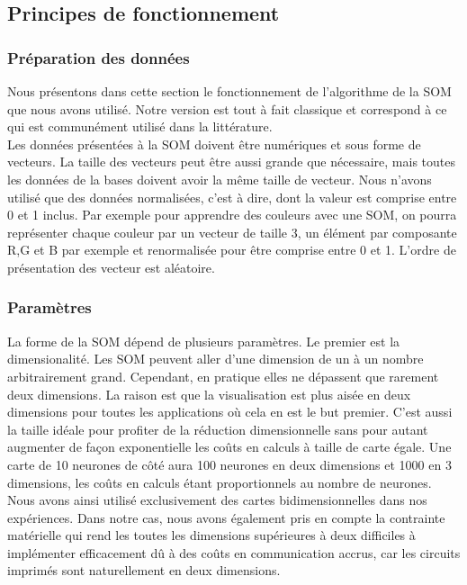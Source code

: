 \subsection{Principes de fonctionnement}
\subsubsection{Préparation des données}

	Nous présentons dans cette section le fonctionnement de l'algorithme de la SOM que nous avons utilisé. Notre version est tout à fait classique et correspond à ce qui est communément utilisé dans la littérature.\\

	Les données présentées à la SOM doivent être numériques et sous forme de vecteurs. La taille des vecteurs peut être aussi grande que nécessaire, mais toutes les données de la bases doivent avoir la même taille de vecteur. Nous n'avons utilisé que des données normalisées, c'est à dire, dont la valeur est comprise entre 0 et 1 inclus. Par exemple pour apprendre des couleurs avec une SOM, on pourra représenter chaque couleur par un vecteur de taille 3, un élément par composante R,G et B par exemple et renormalisée pour être comprise entre 0 et 1. L'ordre de présentation des vecteur est aléatoire.

\subsubsection{Paramètres}\label{param_som}

	La forme de la SOM dépend de plusieurs paramètres. Le premier est la dimensionalité. Les SOM peuvent aller d'une dimension de un à un nombre arbitrairement grand. Cependant, en pratique elles ne dépassent que rarement deux dimensions. La raison est que la visualisation est plus aisée en deux dimensions pour toutes les applications où cela en est le but premier. C'est aussi la taille idéale pour profiter de la réduction dimensionnelle sans pour autant augmenter de façon exponentielle les coûts en calculs à taille de carte égale. Une carte de 10 neurones de côté aura 100 neurones en deux dimensions et 1000 en 3 dimensions, les coûts en calculs étant proportionnels au nombre de neurones. Nous avons ainsi utilisé exclusivement des cartes bidimensionnelles dans nos expériences. Dans notre cas, nous avons également pris en compte la contrainte matérielle qui rend les toutes les dimensions supérieures à deux difficiles à implémenter efficacement dû à des coûts en communication accrus, car les circuits imprimés sont naturellement en deux dimensions.
	
